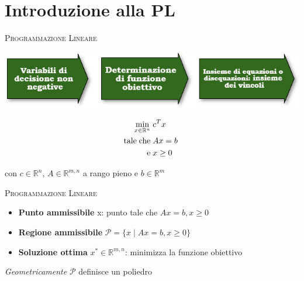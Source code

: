 \begin{frame}[t,plain]
\titlepage
\end{frame}

\begin{frame}
	\frametitle{}
	\hypersetup{linkcolor=black}
	\tableofcontents
\end{frame}




\section{Introduzione alla PL}

\begin{frame}{\textsc{\LARGE Programmazione Lineare}}
	\pause
	\begin{center}
	\includegraphics[width = 9 cm]{fasi.png}
	\end{center}
\pause
\begin{equation*}
\begin{split}
\min\limits_{x\in\mathbb{R}^{n}}\;&c^{T}x\\
\text{tale\;che\;}&Ax= b\;\\\text{e\;}&x\geq0
\end{split}
\end{equation*}
\begin{center}
con $c\in\mathbb{R}^{n}$, $A\in\mathbb{R}^{m,n}$ a rango pieno e $b\in\mathbb{R}^{m}$
\end{center}	
\end{frame}


\begin{frame}{\textsc{\LARGE Programmazione Lineare}}
	\pause
	\begin{itemize}
		\item \textbf{Punto ammissibile} x: punto tale che $Ax = b, x\geq 0$
		\item \textbf{Regione ammissibile} $\mathcal{P}=\{x\;|\; Ax = b, x\geq 0\}$
		\item \textbf{Soluzione ottima} $x^{*}\in\mathbb{R}^{m,n}$: minimizza la funzione obiettivo
	\end{itemize}
\pause
\centering\emph{Geometricamente} $\mathcal{P}$ definisce un poliedro
\end{frame}

